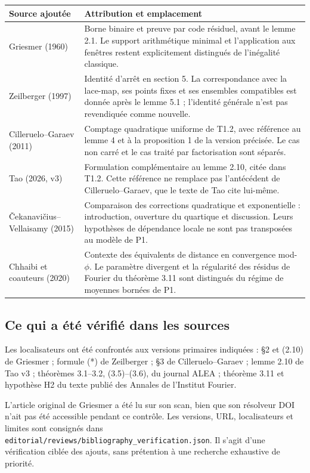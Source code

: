 \documentclass[11pt,a4paper]{article}
\begin{document}
\small
\begin{tabularx}{\textwidth}{@{}>{\raggedright\arraybackslash}p{}>{\raggedright\arraybackslash}X@{}}
\toprule
Source ajoutée & Attribution et emplacement\\
\midrule
{[26]} Griesmer (1960)
& Borne binaire et preuve par code résiduel, avant le lemme 2.1.
Le support arithmétique minimal et l'application aux fenêtres restent
explicitement distingués de l'inégalité classique.\\[6pt]
{[27]} Zeilberger (1997)
& Identité d'arrêt en section 5. La correspondance avec la lace-map,
ses points fixes et ses ensembles compatibles est donnée après le
lemme 5.1 ; l'identité générale n'est pas revendiquée comme nouvelle.\\[6pt]
{[28]} Cilleruelo--Garaev (2011)
& Comptage quadratique uniforme de T1.2, avec référence au lemme 4
et à la proposition 1 de la version précisée. Le cas non carré et
le cas traité par factorisation sont séparés.\\[6pt]
{[29]} Tao (2026, v3)
& Formulation complémentaire au lemme 2.10, citée dans T1.2.
Cette référence ne remplace pas l'antécédent de Cilleruelo--Garaev,
que le texte de Tao cite lui-même.\\[6pt]
{[30]} Čekanavičius--Vellaisamy (2015)
& Comparaison des corrections quadratique et exponentielle :
introduction, ouverture du quartique et discussion. Leurs hypothèses
de dépendance locale ne sont pas transposées au modèle de P1.\\[6pt]
{[31]} Chhaibi et coauteurs (2020)
& Contexte des équivalents de distance en convergence mod-\(\phi\).
Le paramètre divergent et la régularité des résidus de Fourier du
théorème 3.11 sont distingués du régime de moyennes bornées de P1.\\
\bottomrule
\end{tabularx}
\normalsize

\subsection*{Ce qui a été vérifié dans les sources}
Les localisateurs ont été confrontés aux versions primaires indiquées :
§2 et (2.10) de Griesmer ; formule (*) de Zeilberger ;
§3 de Cilleruelo--Garaev ; lemme 2.10 de Tao v3 ;
théorèmes 3.1--3.2, (3.5)--(3.6), du journal ALEA ;
théorème 3.11 et hypothèse H2 du texte publié des Annales de l'Institut Fourier.

L'article original de Griesmer a été lu sur son scan, bien que son
résolveur DOI n'ait pas été accessible pendant ce contrôle.
Les versions, URL, localisateurs et limites sont consignés dans
\texttt{editorial/reviews/bibliography\_verification.json}.
Il s'agit d'une vérification ciblée des ajouts, sans prétention à une
recherche exhaustive de priorité.
\end{document}
